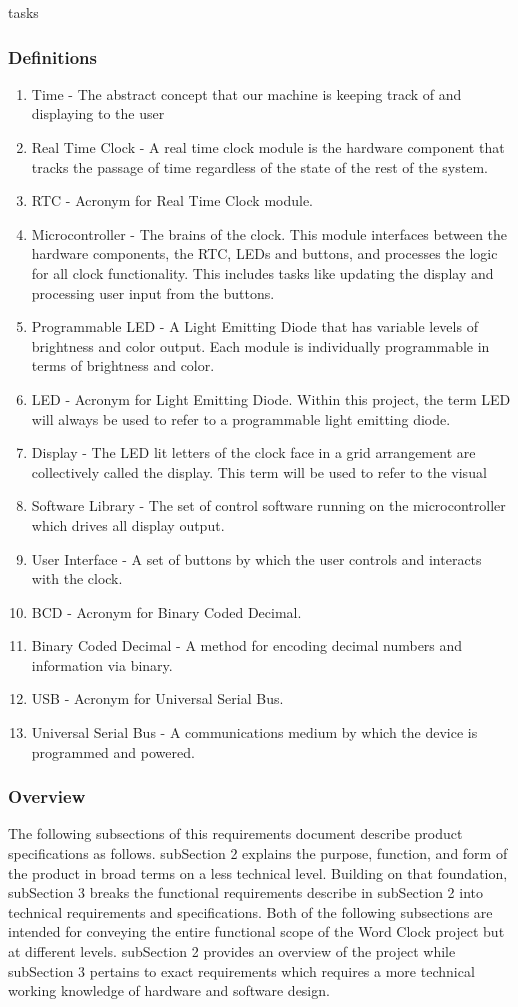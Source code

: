 tasks\documentclass[onecolumn, draftclsnofoot,10pt, compsoc]{IEEEtran}
\begin{document}
\subsubsection{Definitions}
\begin{enumerate}
  \item Time - The abstract concept that our machine is keeping track of and displaying to the user
  \item Real Time Clock - A real time clock module is the hardware component that tracks the passage
  of time regardless of the state of the rest of the system.
  \item RTC - Acronym for Real Time Clock module.
  \item Microcontroller - The brains of the clock. This module interfaces between the hardware
  components, the RTC, LEDs and buttons, and processes the logic for all clock functionality.
  This includes tasks like updating the display and processing user input from the buttons.
  \item Programmable LED - A Light Emitting Diode that has variable levels of brightness and
  color output. Each module is individually programmable in terms of brightness and color.
  \item LED - Acronym for Light Emitting Diode. Within this project, the term LED will always
  be used to refer to a programmable light emitting diode.
  \item Display - The LED lit letters of the clock face in a grid arrangement are collectively
  called the display. This term will be used to refer to the visual
  \item Software Library - The set of control software running on the microcontroller which drives all display output.
  \item User Interface - A set of buttons by which the user controls and interacts with the clock.
  \item BCD - Acronym for Binary Coded Decimal.
  \item Binary Coded Decimal - A method for encoding decimal numbers and information via binary.
  \item USB - Acronym for Universal Serial Bus.
  \item Universal Serial Bus - A communications medium by which the device is programmed and  powered.
\end{enumerate}

\subsubsection{Overview}
The following subsections of this requirements document describe product specifications as follows.
subSection 2 explains the purpose, function, and form of the product in broad terms on a less
technical level. Building on that foundation, subSection 3 breaks the functional requirements
describe in subSection 2 into technical requirements and specifications.
    Both of the following subsections are intended for conveying the entire functional
scope of the Word Clock project but at different levels. subSection 2 provides an overview of the
project while subSection 3 pertains to exact requirements which requires a more technical working
knowledge of hardware and software design.
\end{document}
